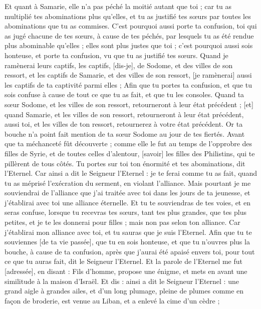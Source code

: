 \begin{multicols}{2}
Et quant à Samarie, elle n'a pas péché la moitié autant que toi ; car tu as multiplié tes abominations plus qu'elles, et tu as justifié tes sœurs par toutes les abominations que tu as commises.
C'est pourquoi aussi porte ta confusion, toi qui as jugé chacune de tes sœurs, à cause de tes péchés, par lesquels tu as été rendue plus abominable qu'elles ; elles sont plus justes que toi ; c'est pourquoi aussi sois honteuse, et porte ta confusion, vu que tu as justifié tes sœurs.
Quand je ramènerai leurs captifs, les captifs, [dis-je], de Sodome, et des villes de son ressort, et les captifs de Samarie, et des villes de son ressort, [je ramènerai] aussi les captifs de ta captivité parmi elles ;
Afin que tu portes ta confusion, et que tu sois confuse à cause de tout ce que tu as fait, et que tu les consoles.
Quand ta sœur Sodome, et les villes de son ressort, retourneront à leur état précédent ; [et] quand Samarie, et les villes de son ressort, retourneront à leur état précédent, aussi toi, et les villes de ton ressort, retournerez à votre état précédent.
Or ta bouche n'a point fait mention de ta sœur Sodome au jour de tes fiertés.
Avant que ta méchanceté fût découverte ; comme elle le fut au temps de l'opprobre des filles de Syrie, et de toutes celles d'alentour, [savoir] les filles des Philistins, qui te pillèrent de tous côtés.
Tu portes sur toi ton énormité et tes abominations, dit l'Eternel.
Car ainsi a dit le Seigneur l'Eternel : je te ferai comme tu as fait, quand tu as méprisé l'exécration du serment, en violant l'alliance.
Mais pourtant je me souviendrai de l'alliance que j'ai traitée avec toi dans les jours de ta jeunesse, et j'établirai avec toi une alliance éternelle.
Et tu te souviendras de tes voies, et en seras confuse, lorsque tu recevras tes sœurs, tant tes plus grandes, que tes plus petites, et je te les donnerai pour filles ; mais non pas selon ton alliance.
Car j'établirai mon alliance avec toi, et tu sauras que je suis l'Eternel.
Afin que tu te souviennes [de ta vie passée], que tu en sois honteuse, et que tu n'ouvres plus la bouche, à cause de ta confusion, après que j'aurai été apaisé envers toi, pour tout ce que tu auras fait, dit le Seigneur l'Eternel.
\VerseOne{}Et la parole de l'Eternel me fut [adressée], en disant :
Fils d'homme, propose une énigme, et mets en avant une similitude à la maison d'Israël.
Et dis : ainsi a dit le Seigneur l'Eternel : une grand aigle à grandes ailes, et d'un long plumage, pleine de plumes comme en façon de broderie, est venue au Liban, et a enlevé la cime d'un cèdre ;

\end{multicols}
